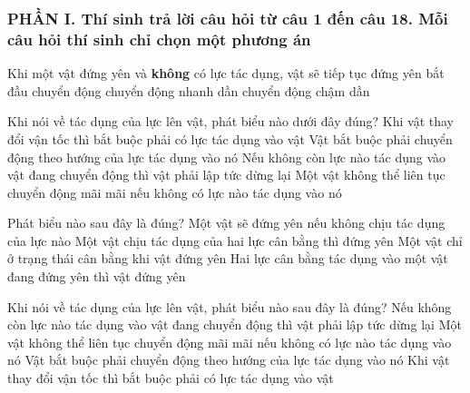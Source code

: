 \subsubsection*{PHẦN I. Thí sinh trả lời câu hỏi từ câu 1 đến câu 18. Mỗi câu hỏi thí sinh chỉ chọn một phương án}
\setcounter{ex}{0}
\begin{ex}%
Khi một vật đứng yên và \textbf{không} có lực tác dụng, vật sẽ
\choice
{\True tiếp tục đứng yên}
{bắt đầu chuyển động}
{chuyển động nhanh dần}
{chuyển động chậm dần}
\loigiai{}
\end{ex}
\begin{ex}%
Khi nói về tác dụng của lực lên vật, phát biểu nào dưới đây đúng?
\choice
{\True Khi vật thay đổi vận tốc thì bắt buộc phải có lực tác dụng vào vật}
{Vật bắt buộc phải chuyển động theo hướng của lực tác dụng vào nó}
{Nếu không còn lực nào tác dụng vào vật đang chuyển động thì vật phải lập tức dừng lại}
{Một vật không thể liên tục chuyển động mãi mãi nếu không có lực nào tác dụng vào nó}
  \end{ex}
\begin{ex}%
Phát biểu nào sau đây là đúng?
\choice
{Một vật sẽ đứng yên nếu không chịu tác dụng của lực nào}
{Một vật chịu tác dụng của hai lực cân bằng thì đứng yên}
{Một vật chỉ ở trạng thái cân bằng khi vật đứng yên}
{\True Hai lực cân bằng tác dụng vào một vật đang đứng yên thì vật đứng yên}
 \end{ex}
\begin{ex}%
Khi nói về tác dụng của lực lên vật, phát biểu nào sau đây là đúng?
\choice
{Nếu không còn lực nào tác dụng vào vật đang chuyển động thì vật phải lập tức dừng lại}
{Một vật không thể liên tục chuyển động mãi mãi nếu không có lực nào tác dụng vào nó}
{Vật bắt buộc phải chuyển động theo hướng của lực tác dụng vào nó}
{\True Khi vật thay đổi vận tốc thì bắt buộc phải có lực tác dụng vào vật}
 \end{ex}
